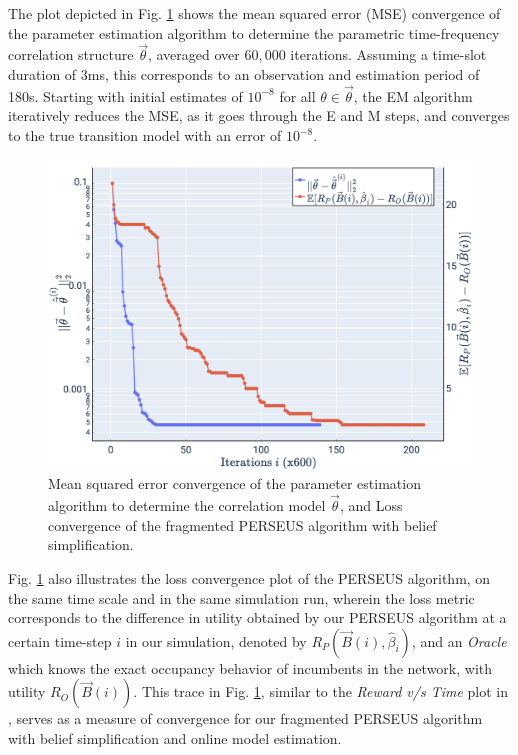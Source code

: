 \documentclass[10pt,twocolumn]{IEEEtran}
\begin{document}
The plot depicted in Fig. \ref{fig:4} shows the mean squared error (MSE) convergence of the parameter estimation algorithm to determine the parametric time-frequency correlation structure $\vec{\theta}$, averaged over $60,000$ iterations. Assuming a time-slot duration of $3$ms, this corresponds 
to an observation and estimation period of 180s. Starting with initial estimates of $10^{-8}$ for all $\theta {\in} \vec{\theta}$, the EM algorithm iteratively reduces the MSE, as it goes through the E and M steps, and converges to the true transition model with an error of $10^{-8}$.
\begin{figure}
    \centering
    \includegraphics[width=0.8\linewidth]{PerseusRegretConvergence_NormSquareErrorConvergence.png}
    \caption{Mean squared error convergence of the parameter estimation algorithm to determine the correlation model $\vec{\theta}$, and Loss convergence of the fragmented PERSEUS algorithm with belief simplification.}
    \vspace{-5mm}
    \label{fig:4}
\end{figure}
Fig. \ref{fig:4} also illustrates the loss convergence plot of the PERSEUS algorithm, on the same time scale and in the same simulation run, wherein the loss metric corresponds to the difference in utility obtained by our PERSEUS algorithm at a certain time-step $i$ in our simulation, denoted by $R_{P}(\vec{B}(i), \hat{\beta}_{i})$, and an \emph{Oracle} which knows the exact occupancy behavior of incumbents in the network, with utility $R_{O}(\vec{B}(i))$. This trace in Fig. \ref{fig:4}, similar to the \emph{Reward v/s Time} plot in \cite{DBLP:journals/corr/abs-1109-2145}, serves as a measure of convergence for our fragmented PERSEUS algorithm with belief simplification and online model estimation.
\end{document}

